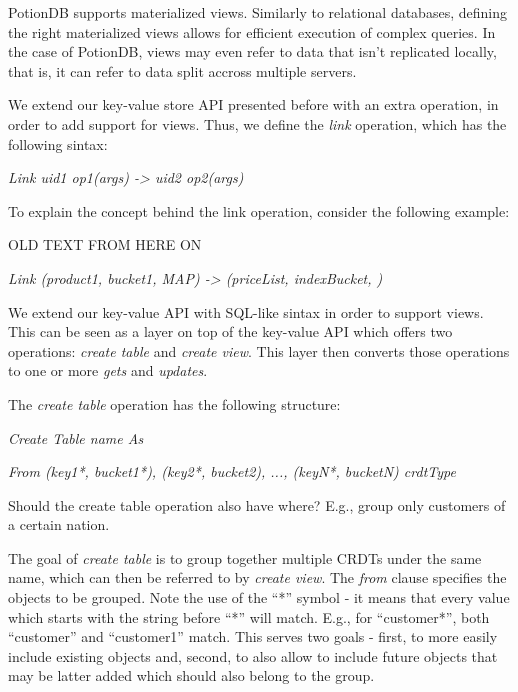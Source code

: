 \documentclass{vldb}
\newcommand{\grumbler}[2]{{\color{red}{\bf #1:} #2}}
\newcommand{\andre}[1]{\grumbler{andre}{#1}}
\newcommand{\emphvspace}{0.5\baselineskip}
\newcommand{\lineemph}[1]{\vspace{\emphvspace}\hspace{2em}\emph{#1}\vspace{\emphvspace}}
\newcommand{\firstblockemph}[1]{\vspace{\emphvspace}\hspace{2em}\emph{#1}}
\newcommand{\lastblockemph}[1]{\hspace{2em}\emph{#1}\vspace{\emphvspace}}
\begin{document}
PotionDB supports materialized views.
Similarly to relational databases, defining the right materialized views allows for efficient execution of complex queries.
In the case of PotionDB, views may even refer to data that isn't replicated locally, that is, it can refer to data split accross multiple servers.

We extend our key-value store API presented before with an extra operation, in order to add support for views.
Thus, we define the \emph{link} operation, which has the following sintax:

\lineemph{Link uid1 op1(args) -> uid2 op2(args)}

To explain the concept behind the link operation, consider the following example:

\andre{OLD TEXT FROM HERE ON}

\lineemph{Link (product1, bucket1, MAP) -> (priceList, indexBucket, )}

We extend our key-value API with SQL-like sintax in order to support views.
This can be seen as a layer on top of the key-value API which offers two operations: \emph{create table} and \emph{create view}.
This layer then converts those operations to one or more \emph{gets} and \emph{updates}.

The \emph{create table} operation has the following structure:

\firstblockemph{Create Table name As}

\lastblockemph{From (key1*, bucket1*), (key2*, bucket2), ..., (keyN*, bucketN) crdtType}

\andre{Should the create table operation also have where? E.g., group only customers of a certain nation.}

The goal of \emph{create table} is to group together multiple CRDTs under the same name, which can then be referred to by \emph{create view}.
The \emph{from} clause specifies the objects to be grouped.
Note the use of the ``*'' symbol - it means that every value which starts with the string before ``*'' will match.
E.g., for ``customer*'', both ``customer'' and ``customer1'' match.
This serves two goals - first, to more easily include existing objects and, second, to also allow to include future objects that may be latter added which should also belong to the group.
\end{document}
